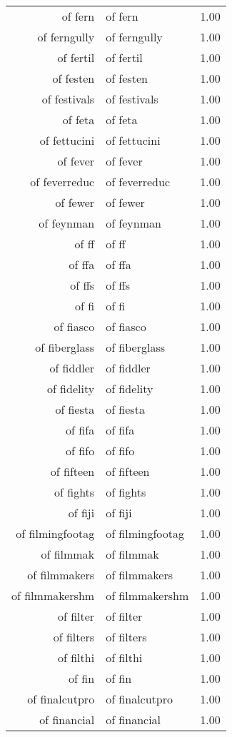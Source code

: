 \begin{table}[ht]
\begin{tabular}{rlr}
  of fern & of fern & 1.00 \\ 
  of ferngully & of ferngully & 1.00 \\ 
  of fertil & of fertil & 1.00 \\ 
  of festen & of festen & 1.00 \\ 
  of festivals & of festivals & 1.00 \\ 
  of feta & of feta & 1.00 \\ 
  of fettucini & of fettucini & 1.00 \\ 
  of fever & of fever & 1.00 \\ 
  of feverreduc & of feverreduc & 1.00 \\ 
  of fewer & of fewer & 1.00 \\ 
  of feynman & of feynman & 1.00 \\ 
  of ff & of ff & 1.00 \\ 
  of ffa & of ffa & 1.00 \\ 
  of ffs & of ffs & 1.00 \\ 
  of fi & of fi & 1.00 \\ 
  of fiasco & of fiasco & 1.00 \\ 
  of fiberglass & of fiberglass & 1.00 \\ 
  of fiddler & of fiddler & 1.00 \\ 
  of fidelity & of fidelity & 1.00 \\ 
  of fiesta & of fiesta & 1.00 \\ 
  of fifa & of fifa & 1.00 \\ 
  of fifo & of fifo & 1.00 \\ 
  of fifteen & of fifteen & 1.00 \\ 
  of fights & of fights & 1.00 \\ 
  of fiji & of fiji & 1.00 \\ 
  of filmingfootag & of filmingfootag & 1.00 \\ 
  of filmmak & of filmmak & 1.00 \\ 
  of filmmakers & of filmmakers & 1.00 \\ 
  of filmmakershm & of filmmakershm & 1.00 \\ 
  of filter & of filter & 1.00 \\ 
  of filters & of filters & 1.00 \\ 
  of filthi & of filthi & 1.00 \\ 
  of fin & of fin & 1.00 \\ 
  of finalcutpro & of finalcutpro & 1.00 \\ 
  of financial & of financial & 1.00 \\ 

\end{tabular}
\end{table}
